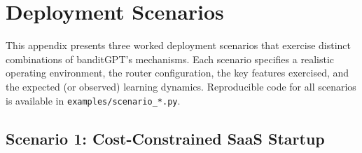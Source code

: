 
\section{Deployment Scenarios}
\label{app:deployment_scenarios}

This appendix presents three worked deployment scenarios that exercise distinct combinations of banditGPT's mechanisms.  Each scenario specifies a realistic operating environment, the router configuration, the key features exercised, and the expected (or observed) learning dynamics.  Reproducible code for all scenarios is available in \texttt{examples/scenario\_*.py}.

\begin{table}[htbp]
\centering
\caption{Summary of deployment scenarios and the banditGPT mechanisms each exercises.}
\label{tab:scenario_summary}
\small
{}
\end{table}


\subsection{Scenario 1: Cost-Constrained SaaS Startup}
\label{app:scenario_cost}

